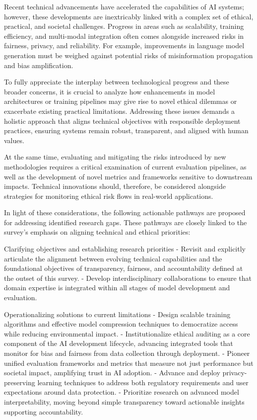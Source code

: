 \documentclass[sigconf]{acmart}
\begin{document}
Recent technical advancements have accelerated the capabilities of AI systems; however, these developments are inextricably linked with a complex set of ethical, practical, and societal challenges. Progress in areas such as scalability, training efficiency, and multi-modal integration often comes alongside increased risks in fairness, privacy, and reliability. For example, improvements in language model generation must be weighed against potential risks of misinformation propagation and bias amplification.

To fully appreciate the interplay between technological progress and these broader concerns, it is crucial to analyze how enhancements in model architectures or training pipelines may give rise to novel ethical dilemmas or exacerbate existing practical limitations. Addressing these issues demands a holistic approach that aligns technical objectives with responsible deployment practices, ensuring systems remain robust, transparent, and aligned with human values.

At the same time, evaluating and mitigating the risks introduced by new methodologies requires a critical examination of current evaluation pipelines, as well as the development of novel metrics and frameworks sensitive to downstream impacts. Technical innovations should, therefore, be considered alongside strategies for monitoring ethical risk flows in real-world applications.

In light of these considerations, the following actionable pathways are proposed for addressing identified research gaps. These pathways are closely linked to the survey's emphasis on aligning technical and ethical priorities:

Clarifying objectives and establishing research priorities
- Revisit and explicitly articulate the alignment between evolving technical capabilities and the foundational objectives of transparency, fairness, and accountability defined at the outset of this survey.
- Develop interdisciplinary collaborations to ensure that domain expertise is integrated within all stages of model development and evaluation.

Operationalizing solutions to current limitations
- Design scalable training algorithms and effective model compression techniques to democratize access while reducing environmental impact.
- Institutionalize ethical auditing as a core component of the AI development lifecycle, advancing integrated tools that monitor for bias and fairness from data collection through deployment.
- Pioneer unified evaluation frameworks and metrics that measure not just performance but societal impact, amplifying trust in AI adoption.
- Advance and deploy privacy-preserving learning techniques to address both regulatory requirements and user expectations around data protection.
- Prioritize research on advanced model interpretability, moving beyond simple transparency toward actionable insights supporting accountability.
\end{document}
